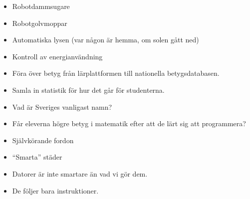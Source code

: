 \begin{frame}
  \begin{example}[Hemautomation]
    \begin{itemize}
      \item Robotdammsugare
      \item Robotgolvmoppar
      \item Automatiska lysen (var någon är hemma, om solen gått ned)
      \item Kontroll av energianvändning
    \end{itemize}
  \end{example}
\end{frame}

\begin{frame}
  \begin{example}
    \begin{itemize}
      \item Föra över betyg från lärplattformen till nationella 
        betygsdatabasen.
      \item Samla in statistik för hur det går för studenterna.
    \end{itemize}
  \end{example}

  \begin{example}
    \begin{itemize}
      \item Vad är Sveriges vanligast namn?
      \item Får eleverna högre betyg i matematik efter att de lärt sig att 
        programmera?
    \end{itemize}
  \end{example}
\end{frame}


\begin{frame}
  \begin{example}
    \begin{itemize}
      \item Självkörande fordon
      \item \enquote{Smarta} städer
    \end{itemize}
  \end{example}

  \pause

  \begin{remark}
    \begin{itemize}
      \item Datorer är inte smartare än vad vi gör dem.
      \item De följer bara instruktioner.
    \end{itemize}
  \end{remark}
\end{frame}


